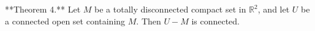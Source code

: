 **Theorem 4.** Let $M$ be a totally disconnected compact set in $\mathbb{R}^2$, and let $U$ be a connected open set containing $M$. Then $U - M$ is connected.

